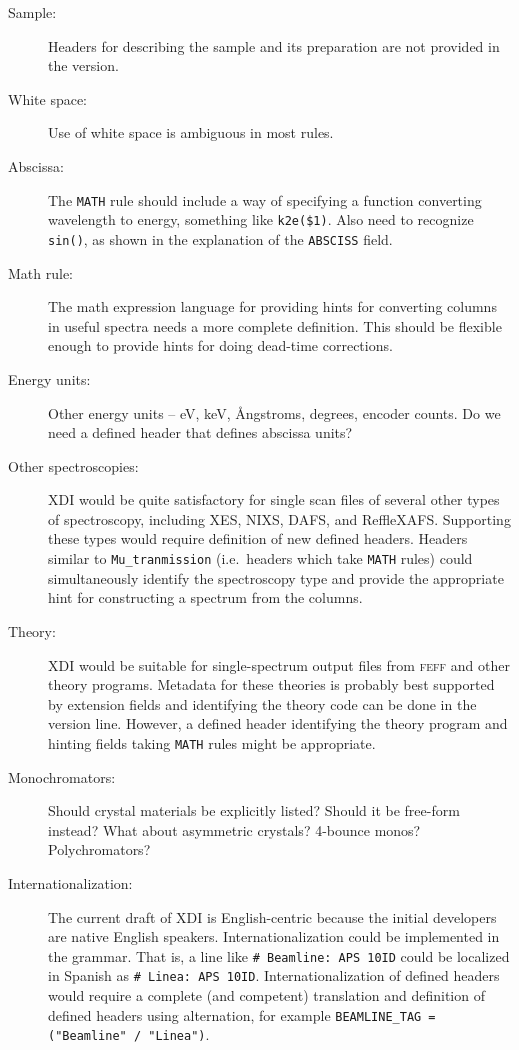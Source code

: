 \documentclass{article}
\newcommand{\xdi}{\textsf{XDI}}
\begin{document}
\begin{description}
\item[Sample:] Headers for describing the sample and its preparation
  are not provided in the version.
\item[White space:] Use of white space is ambiguous in most rules.
\item[Abscissa:] The \texttt{MATH} rule should include a way of
  specifying a function converting wavelength to energy, something
  like \texttt{k2e(\$1)}.  Also need to recognize \texttt{sin()}, as
  shown in the explanation of the \texttt{ABSCISS}
  field.\label{anchor:math}
\item[Math rule:] The math expression language for providing hints for
  converting columns in useful spectra needs a more complete
  definition.  This should be flexible enough to provide hints for
  doing dead-time corrections.
\item[Energy units:] Other energy units -- eV, keV, {\AA}ngstroms,
  degrees, encoder counts.  Do we need a defined header that defines
  abscissa units?\label{anchor:units}
\item[Other spectroscopies:] {\xdi} would be quite satisfactory for
  single scan files of several other types of spectroscopy, including
  XES, NIXS, DAFS, and ReffleXAFS.  Supporting these types would
  require definition of new defined headers.  Headers similar to
  \texttt{Mu\_tranmission} (i.e.\ headers which take \texttt{MATH}
  rules) could simultaneously identify the spectroscopy type and
  provide the appropriate hint for constructing a spectrum from the
  columns.
\item[Theory:] {\xdi} would be suitable for single-spectrum output
  files from \textsc{feff} and other theory programs.  Metadata for
  these theories is probably best supported by extension fields and
  identifying the theory code can be done in the version line.
  However, a defined header identifying the theory program and hinting
  fields taking \texttt{MATH} rules might be appropriate.
\item[Monochromators:] Should crystal materials be explicitly listed?
  Should it be free-form instead?  What about asymmetric crystals?
  4-bounce monos?  Polychromators?\label{anchor:mono}
\item[Internationalization:] The current draft of {\xdi} is
  English-centric because the initial developers are native English
  speakers.  Internationalization could be implemented in the grammar.
  That is, a line like \texttt{\# Beamline:\ APS 10ID} could be
  localized in Spanish as \texttt{\# Linea:\ APS 10ID}.
  Internationalization of defined headers would require a complete
  (and competent) translation and definition of defined headers using
  alternation, for example \texttt{BEAMLINE\_TAG = ("Beamline" / "Linea")}.


\end{description}
\end{document}
